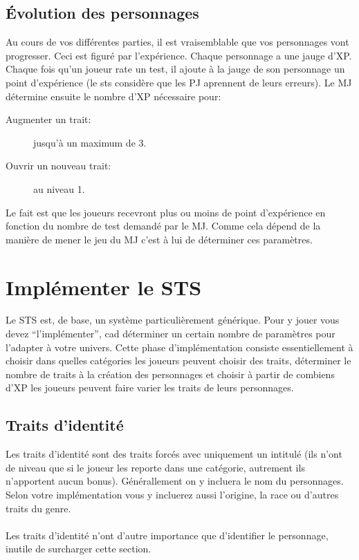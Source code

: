 \documentclass[a4paper,10pt,twoside,twocolumn]{article}
\begin{document}
 
 \subsection{Évolution des personnages}
 \label{rule::evolv}
 
 Au cours de vos différentes parties, il est vraisemblable que vos personnages vont progresser. Ceci est figuré par l'expérience. Chaque personnage a une jauge d'XP. Chaque fois qu'un joueur rate un test, il ajoute à la jauge de son personnage un point d'expérience (le sts considère que les PJ aprennent de leurs erreurs). Le MJ détermine ensuite le nombre d'XP nécessaire pour:
 
 \begin{description}
  \item[Augmenter un trait:] jusqu'à un maximum de 3.
  \item[Ouvrir un nouveau trait:] au niveau 1.
 \end{description}

 Le fait est que les joueurs recevront plus ou moins de point d'expérience en fonction du nombre de test demandé par le MJ. Comme cela dépend de la manière de mener le jeu du MJ c'est à lui de déterminer ces paramètres.
 
 \section{Implémenter le STS}
 \label{implem}
 
 Le STS est, de base, un système particulièrement générique. Pour y jouer vous devez ``l'implémenter'', cad déterminer un certain nombre de paramètres pour l'adapter à votre univers. Cette phase d'implémentation consiste essentiellement à choisir dans quelles catégories les joueurs peuvent choisir des traits, déterminer le nombre de traits à la création des personnages et choisir à partir de combiens d'XP les joueurs peuvent faire varier les traits de leurs personnages.
 
 \subsection{Traits d'identité}
 \label{implem::traits}
 
 Les traits d'identité sont des traits forcés avec uniquement un intitulé (ils n'ont de niveau que si le joueur les reporte dans une catégorie, autrement ils n'apportent aucun bonus). Générallement on y incluera le nom du personnages. Selon votre implémentation vous y incluerez aussi l'origine, la race ou d'autres traits du genre.\\
 \\
 Les traits d'identité n'ont d'autre importance que d'identifier le personnage, inutile de surcharger cette section.\\
 \\
 
\end{document}
